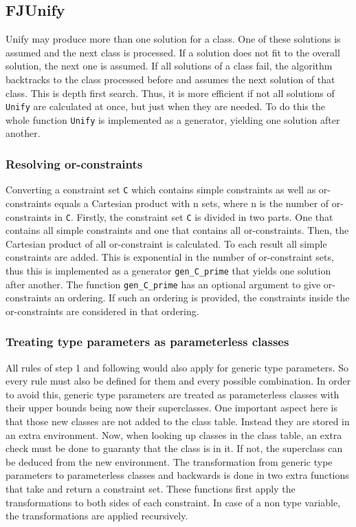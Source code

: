 \subsection{FJUnify}

Unify may produce more than one solution for a class. One of these solutions is assumed and the next class is processed. If a solution does not fit to the overall solution, the next one is assumed.
If all solutions of a class fail, the algorithm backtracks to the class processed before and assumes the next solution of that class. This is depth first search. Thus, it is more efficient if not all solutions of \verb|Unify| are calculated at once, but just when they are needed.
To do this the whole function \verb|Unify| is implemented as a generator, yielding one solution after another.

\subsubsection{Resolving or-constraints}
Converting a constraint set \verb|C| which contains simple constraints as well as or-constraints equals a Cartesian product with n sets, where n is the number of or-constraints in \verb|C|.
Firstly, the constraint set \verb|C| is divided in two parts. One that contains all simple constraints and one that contains all or-constraints.
Then, the Cartesian product of all or-constraint is calculated. To each result all simple constraints are added. This is exponential in the number of or-constraint sets, thus this is implemented as a generator \verb|gen_C_prime| that yields one solution after another.
The function \verb|gen_C_prime| has an optional argument to give or-constraints an ordering. If such an ordering is provided, the constraints inside the or-constraints are considered in that ordering.

\subsubsection{Treating type parameters as parameterless classes}
All rules of step 1 and following would also apply for generic type parameters. So every rule must also be defined for them and every possible combination. In order to avoid this, generic type parameters are treated as parameterless classes with their upper bounds being now their superclasses. One important aspect here is that those new classes are not added to the class table. Instead they are stored in an extra environment. Now, when looking up classes in the class table, an extra check must be done to guaranty that the class is in it. If not, the superclass can be deduced from the new environment.
The transformation from  generic type parameters to parameterless classes and backwards is done in two extra functions that take and return a constraint set.
These functions first apply the transformations to both sides of each constraint. In case of a non type variable, the transformations are applied recursively.

